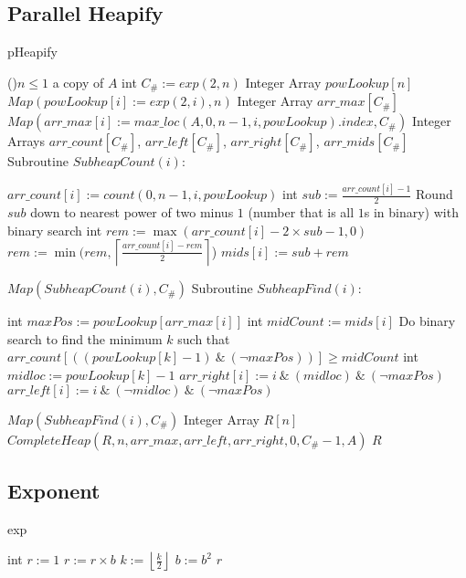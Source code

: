 \documentclass[letterpaper, reqno, 11pt]{article}
\begin{document}
\subsection*{Parallel Heapify}
\begin{algorithm}[H]
\caption{pHeapify}
\If(){$n\leq1$}
{
	\Return a copy of $A$\;
}
int $C_\#:=exp(2, n)$
Integer Array $powLookup[n]$\;
$Map(powLookup[i]:=exp(2,i),n)$
Integer Array $arr\_max[C_\#]$
$Map(arr\_max[i]:=max\_loc(A,0,n-1,i,powLookup).index, C_\#)$\;
Integer Arrays $arr\_count[C_\#]$, $arr\_left[C_\#]$, $arr\_right[C_\#]$, $arr\_mids[C_\#]$\;
Subroutine $SubheapCount(i)$:
\begin{description}
	\item{}
	$arr\_count[i]:=count(0,n-1,i,powLookup)$\;
	int $sub:=\frac{arr\_count[i]-1}{2}$\;
	Round $sub$ down to nearest power of two minus $1$
	(number that is all $1$s in binary) with binary search\;
	int $rem:=\max(arr\_count[i]-2\times sub-1,0)$
	$rem:=\min(rem,\left\lceil\frac{arr\_count[i]-rem}{2}\right\rceil$)
	$mids[i]:=sub+rem$
\end{description}
$Map(SubheapCount(i), C_\#)$\;
Subroutine $SubheapFind(i)$:
\begin{description}
	\item{}
	int $maxPos:=powLookup[arr\_max[i]]$
	int $midCount:=mids[i]$
	Do binary search to find the minimum $k$ such that
	$arr\_count[((powLookup[k]-1)\ \&\ (\neg maxPos))]\geq midCount$
	int $midloc:=powLookup[k]-1$
	$arr\_right[i]:=i\ \&\ (midloc)\ \&\ (\neg maxPos)$\;
	$arr\_left[i]:=i\ \&\ (\neg midloc)\ \&\ (\neg maxPos)$\;
\end{description}
$Map(SubheapFind(i), C_\#)$\;
Integer Array $R[n]$\;
$CompleteHeap(R, n, arr\_max, arr\_left, arr\_right, 0, C_\#-1, A)$\;
\Return $R$\;
\end{algorithm}

\subsection*{Exponent}
\begin{algorithm}[H]
\caption{exp}
int $r:=1$
{
	{
		$r:=r\times b$\;
	}
	$k:=\left\lfloor\frac{k}{2}\right\rfloor$\;
	$b:=b^2$\;
}
\Return $r$\;
\end{algorithm}
\end{document}
